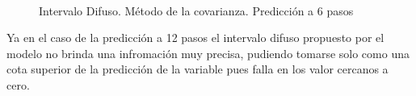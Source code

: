 \documentclass[12pt]{article}
\begin{document}
\begin{figure}
		\centering
		\captionsetup{justification=centering}
		\\
		\caption{Intervalo Difuso. Método de la covarianza. Predicción a 6 pasos}
		\label{f_P2SalidaCovp6}
\end{figure}

Ya en el caso de la predicción a 12 pasos el intervalo difuso propuesto por el modelo no brinda una infromación muy precisa, pudiendo tomarse solo como una cota superior de la predicción de la variable pues falla en los valor cercanos a cero.
\end{document}
